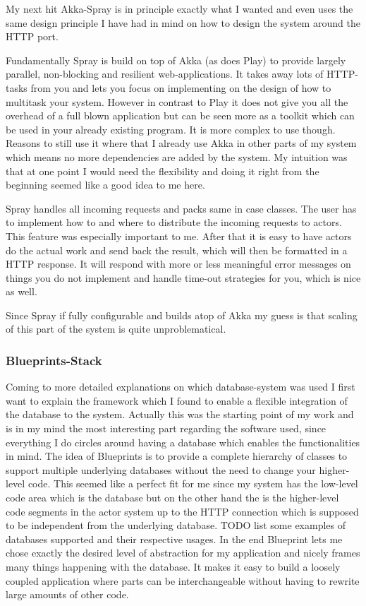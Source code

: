 \documentclass[11p]{scrartcl}
\begin{document}
My next hit Akka-Spray is in principle exactly what I wanted and even uses the same design principle I have had in mind on how to design the system around the HTTP port.

Fundamentally Spray is build on top of Akka (as does Play) to provide largely parallel, non-blocking and resilient web-applications. It takes away lots of HTTP-tasks from you and lets you focus on implementing on the design of how to multitask your system. However in contrast to Play it does not give you all the overhead of a full blown application but can be seen more as a toolkit which can be used in your already existing program.
It is more complex to use though. Reasons to still use it where that I already use Akka in other parts of my system which means no more dependencies are added by the system. My intuition was that at one point I would need the flexibility and doing it right from the beginning seemed like a good idea to me here.

Spray handles all incoming requests and packs same in case classes. The user has to implement how to and where to distribute the incoming requests to actors. This feature was especially important to me. After that it is easy to have actors do the actual work and send back the result, which will then be formatted in a HTTP response.  It will respond with more or less meaningful error messages on things you do not implement and handle time-out strategies for you, which is nice as well.

Since Spray if fully configurable and builds atop of Akka my guess is that scaling of this part of the system is quite unproblematical. 

\subsubsection{Blueprints-Stack}
Coming to more detailed explanations on which database-system was used I first want to explain the framework which I found to enable a flexible integration of the database to the system.
Actually this was the starting point of my work and is in my mind the most interesting part regarding the software used, since everything I do circles around having a database which enables the functionalities in mind.
The idea of Blueprints is to provide a complete hierarchy of classes to support multiple underlying databases without the need to change your higher-level code. This seemed like a perfect fit for me since my system has the low-level code area which is the database but on the other hand the is the higher-level code segments in the actor system up to the HTTP connection which is supposed to be independent from the underlying database.
TODO list some examples of databases supported and their respective usages.
In the end Blueprint lets me chose exactly the desired level of abstraction for my application and nicely frames many things happening with the database. It makes it easy to build a loosely coupled application where parts can be interchangeable without having to rewrite large amounts of other code.
\end{document}
